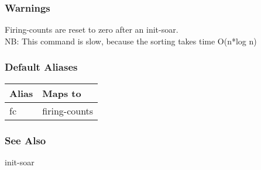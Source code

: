 \subsubsection*{Warnings}
 Firing-counts are reset to zero after an init-soar. \\ 
 NB: This command is slow, because the sorting takes time O(n*log n) 
\subsubsection*{Default Aliases}
\begin{tabular}{|l|l|}
\hline 
 Alias  & Maps to  \\
 \hline 
 fc  & firing-counts  \\
 \hline 
\end{tabular}
\subsubsection*{See Also}
 init-soar
